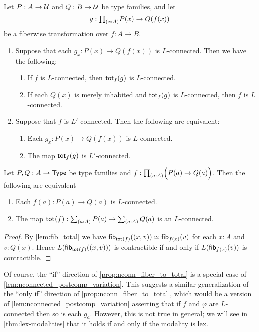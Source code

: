 \begin{cor}\label{lem:nconnected_postcomp_variation}
Let $P:A\to\UU$ and $Q:B\to\UU$ be type families, and let
\begin{equation*}
g:\prd{x:A}P(x)\to Q(f(x))
\end{equation*}
be a fiberwise transformation over $f:A\to B$.
\begin{enumerate}
\item Suppose that each $g_x:P(x)\to Q(f(x))$ is $L$-connected. Then we have the following:
\begin{enumerate}
\item If $f$ is $L$-connected, then $\total[f]{g}$ is $L$-connected.
\item If each $Q(x)$ is merely inhabited and $\total[f]{g}$ is $L$-connected, then $f$ is $L$-connected.
\end{enumerate}
\item Suppose that $f$ is $L'$-connected. Then the following are equivalent:
\begin{enumerate}
\item Each $g_x:P(x)\to Q(f(x))$ is $L$-connected.
\item The map $\total[f]{g}$ is $L'$-connected.
\end{enumerate}  
\end{enumerate}
\end{cor}

\begin{prp}\label{prop:nconn_fiber_to_total}
Let $P,Q:A\to\type$ be type families and $f:\prd{a:A} \Parens{P(a)\to Q(a)}$. Then the following are equivalent
\begin{enumerate}
\item Each $f(a):P(a)\to Q(a)$ is $L$-connected.
\item The map $\total{f}: \sm{a:A}P(a) \to \sm{a:A} Q(a)$ is an $L$-connected.
\end{enumerate}
\end{prp}

\begin{proof}
By \cref{lem:fib_total} we have $\fib{\total f}{\pairr{x,v}}\eqvsym\fib{f(x)}v$
for each $x:A$ and $v:Q(x)$. Hence $L(\fib{\total f}{\pairr{x,v}})$ is contractible if and only if
$L(\fib{f(x)}v)$ is contractible.
\end{proof}

Of course, the ``if'' direction of \cref{prop:nconn_fiber_to_total} is a special case of \cref{lem:nconnected_postcomp_variation}.
This suggests a similar generalization of the ``only if'' direction of \cref{prop:nconn_fiber_to_total}, which would be a version of \cref{lem:nconnected_postcomp_variation} asserting that if $f$ and $\varphi$ are $L$-connected then so is each $g_a$.
However, this is not true in general; we will see in \cref{thm:lex-modalities} that it holds if and only if the modality is lex.

